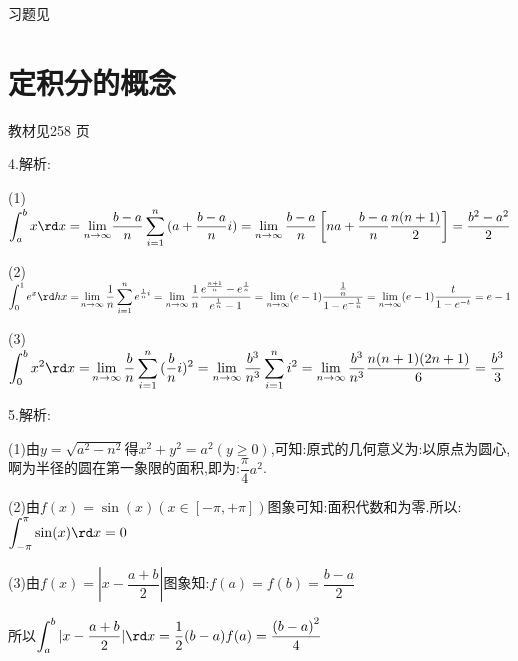 \begin{flushright}
  \color{zhanqing!80}
   习题见
\end{flushright}


\section{定积分的概念}
\begin{flushright}
  \color{zhanqing!80}
  \color{zhanqing!80}
   教材见258 页 %
\end{flushright}


4.解析:

(1)$\displaystyle\int_a^b {x\rd x = \mathop {\lim }\limits_{n \to \infty } } \dfrac{{b - a}}{n}\sum\limits_{i = 1}^n {(a + \dfrac{{b - a}}{n}i)}  = \mathop {\lim }\limits_{n \to \infty } \dfrac{{b - a}}{n}\left[ {na + \frac{{b - a}}{n}\dfrac{{n(n + 1)}}{2}} \right] = \dfrac{{{b^2} - {a^2}}}{2}$

(2)$\displaystyle\int_0^1 {{e^x}\rd hx = } \mathop {\lim }\limits_{n \to \infty } \dfrac{1}{n}\sum\limits_{i = 1}^n {{e^{\frac{1}{n}i}}}  = \mathop {\lim }\limits_{n \to \infty } \dfrac{1}{n}\dfrac{{{e^{\frac{{n + 1}}{n}}} - {e^{\frac{1}{n}}}}}{{{e^{\frac{1}{n}}} - 1}} = \mathop {\lim }\limits_{n \to \infty } (e - 1)\dfrac{{\frac{1}{n}}}{{1 - {e^{ - \frac{1}{n}}}}} = \mathop {\lim }\limits_{n \to \infty } (e - 1)\dfrac{t}{{1 - {e^{ - t}}}} = e - 1$

(3)$\displaystyle\int_0^b {{x^2}\rd x = } \mathop {\lim }\limits_{n \to \infty } \dfrac{b}{n}\sum\limits_{i = 1}^n {(\dfrac{b}{n}} i{)^2} = \mathop {\lim }\limits_{n \to \infty } \dfrac{{{b^3}}}{{{n^3}}}\sum\limits_{i = 1}^n {{i^2}}  = \mathop {\lim }\limits_{n \to \infty } \frac{{{b^3}}}{{{n^3}}}\dfrac{{n(n + 1)(2n + 1)}}{6} = \frac{{{b^3}}}{3}$

5.解析:

(1)由$y = \sqrt {{a^2} - {n^2}} $得${x^2} + {y^2} = {a^2}(y \geqslant 0)$,可知:原式的几何意义为:以原点为圆心,啊为半径的圆在第一象限的面积,即为:$\dfrac{\pi }{4}{a^2}$.

(2)由$f(x) = \sin (x)(x \in \left[ { - \pi , + \pi } \right])$图象可知:面积代数和为零.所以:$\displaystyle\int_{ - \pi }^\pi  {\sin (x)\rd x = 0} $

(3)由$f(x) = |x - \dfrac{{a + b}}{2}|$图象知:$f(a) = f(b) = \dfrac{{b - a}}{2}$

所以$\displaystyle\int_a^b {|x - \frac{{a + b}}{2}|} \rd x = \frac{1}{2}(b - a)f(a) = \dfrac{{{{(b - a)}^2}}}{4}$

